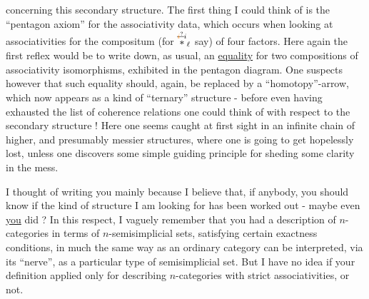 concerning this secondary structure. The first thing I could think of is the ``pentagon axiom'' for the associativity data, which occurs when looking at associativities for the compositum (for $\overset{\deleted{\unsure{i}}i}{*}_\ell$ say) of four factors. Here again\deleted{\unsure{,}} the first reflex would be to write down, as usual, an \uline{equality} for  two compositions of associativity isomorphisms, exhibited in the pentagon diagram. One suspects however that such equality should, again, be replaced by a ``homotopy''-arrow, which now appears as a kind of ``ternary'' structure - before even having exhausted the list of coherence relations one could think of with respect to the secondary structure ! Here one seems caught at first sight in an infinite chain of  higher, and presumably\handwritten{,} messier structures, where one is going to get hopelessly lost, unless one discovers some simple guiding principle for sheding some clarity in the mess.

\quad I thought of writing you mainly because I believe that, if anybody, you should know if the kind of structure I am looking for has been worked out - maybe even \uline{you} did ? In this respect, I vaguely remember that you had a description of $n$-categories in terms of $n$-semisimplicial sets, satisfying certain exactness conditions, in much the same way as an ordinary category can be interpreted, via its ``nerve'', as a particular type of semisimplicial set. But I have no idea if your definition applied only for describing $n$-categories with strict associativities, or not.

